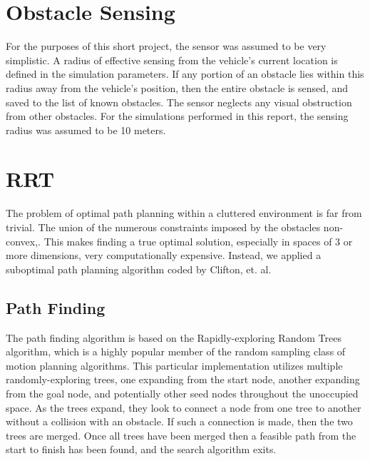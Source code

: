 \section{Obstacle Sensing \label{sec:sensing}}
For the purposes of this short project, the sensor was assumed to be very simplistic.  A radius of effective sensing from the vehicle's current location is defined in the simulation parameters.  If any portion of an obstacle lies within this radius away from the vehicle's position, then the entire obstacle is sensed, and saved to the list of known obstacles.  The sensor neglects any visual obstruction from other obstacles.  For the simulations performed in this report, the sensing radius was assumed to be 10 meters.

\section{RRT \label{sec:training}}
The problem of optimal path planning within a cluttered environment is far from trivial.  The union of the numerous constraints imposed by the obstacles non-convex,.  This makes finding a true optimal solution, especially in spaces of 3 or more dimensions, very computationally expensive.  Instead, we applied a suboptimal path planning algorithm coded by Clifton, et. al. \cite{clifton2008evaluating}

\subsection{Path Finding}
 The path finding algorithm is based on the Rapidly-exploring Random Trees algorithm, which is a highly popular member of the random sampling class of motion planning algorithms.  This particular implementation utilizes multiple randomly-exploring trees, one expanding from the start node, another expanding from the goal node, and potentially other seed nodes throughout the unoccupied space.  As the trees expand, they look to connect a node from one tree to another without a collision with an obstacle.  If such a connection is made, then the two trees are merged.  Once all trees have been merged then a feasible path from the start to finish has been found, and the search algorithm exits.


